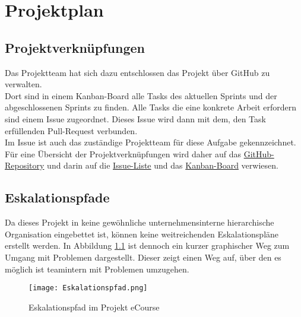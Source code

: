 \chapter{Projektplan}
\section{Projektverknüpfungen}
Das Projektteam hat sich dazu entschlossen das Projekt über \gls{GitHub} zu verwalten. \\
Dort sind in einem \gls{Kanban-Board} alle Tasks des aktuellen \gls{Sprint}s und der abgeschlossenen \gls{Sprint}s zu finden. Alle Tasks die eine konkrete Arbeit erfordern sind einem \gls{Issue} zugeordnet. Dieses \gls{Issue} wird dann mit dem, den Task erfüllenden \gls{Pull-Request} verbunden. \\
Im \gls{Issue} ist auch das zuständige Projektteam für diese Aufgabe gekennzeichnet.\\
Für eine Übersicht der Projektverknüpfungen wird daher auf das \href{https://github.com/LucRome/SWE_Semester4/}{GitHub-Repository} und darin auf die \href{https://github.com/LucRome/SWE_Semester4/issues}{Issue-Liste} und das \href{https://github.com/LucRome/SWE_Semester4/projects/1}{Kanban-Board} verwiesen.
\section{Eskalationspfade}
Da dieses Projekt in keine gewöhnliche unternehmensinterne hierarchische Organisation eingebettet ist, können keine weitreichenden Eskalationspläne erstellt werden. In Abbildung \ref{fib:Eskalationspfad} ist dennoch ein kurzer graphischer Weg zum Umgang mit Problemen dargestellt. Dieser zeigt einen Weg auf, über den es möglich ist teamintern mit Problemen umzugehen.\\

\begin{figure}[h]
\centering
\texttt{[image: Eskalationspfad.png]}
\caption{Eskalationspfad im Projekt eCourse}
\label{fib:Eskalationspfad}
\end{figure}

